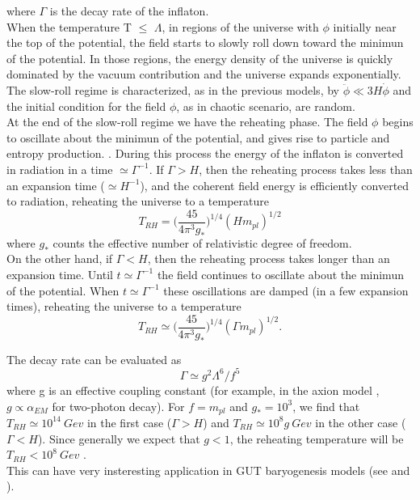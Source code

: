 \documentclass[11pt,a4paper,twoside]{book}
\begin{document}
where $\Gamma$ is the decay rate of the inflaton.\\
When the temperature T $\le$ $\Lambda$, in regions of the universe with $\phi$ initially near the top of the potential, the field starts to slowly roll down toward the minimun of the potential. In those regions, the energy density of the universe is quickly dominated by the vacuum contribution and the universe expands exponentially. The slow-roll regime is characterized,  as in the previous models, by $ \ddot{\phi} \ll 3H\dot{\phi} $ and the initial condition for the field $\phi$, as in chaotic scenario, are random. \\
At the end of the slow-roll regime we have the reheating phase. The field $\phi$ begins to oscillate about the minimun of the potential, and gives rise to particle and entropy production. .
During this process the energy of the inflaton is converted in radiation in a time $\simeq \Gamma^{-1}$. If $\Gamma > H$, then the reheating process takes less than an expansion time ($\simeq H^{-1}$), and the coherent field energy is efficiently converted to radiation, reheating the universe to a temperature \cite{Chap2:NaturalInflation_Turner_Steinhardt}
\begin{equation}
\label{Chap2:ReheatingTemperatureSmallFieldModel}
T_{RH}=\Big (\frac{45}{4\pi^{3}g_{*}}\Big )^{1/4} (Hm_{pl})^{1/2}
\end{equation}
where $ g_{*} $ counts the effective number of relativistic degree of freedom.\\
On the other hand, if $ \Gamma < H $, then the reheating process takes longer than an expansion time. Until $ t \simeq \Gamma^{-1} $ the field continues to oscillate about the minimun of the potential. When $ t \simeq \Gamma^{-1} $ these oscillations are damped (in a few expansion times), reheating the universe to a temperature
\begin{equation}
	T_{RH} \simeq \Big (\frac{45}{4\pi^{3}g_{*}}\Big)^{1/4}(\Gamma m_{pl})^{1/2}.
\end{equation}

The decay rate can be evaluated as 
\begin{equation}
	\label{Chap2:DecayRate}
	\Gamma \simeq g^{2}\Lambda^{6}/f^{5}
\end{equation}
where g is an effective coupling constant (for example, in the axion model \cite{Chap2:AxionModel}, $ g \propto \alpha_{EM} $ for two-photon decay). For $ f=m_{pl} $ and $ g_{*}=10^{3} $, we find that $ T_{RH} \simeq 10^{14}\ Gev $ in the first case ($ \Gamma > H $) and $ T_{RH} \simeq 10^{8} g\ Gev$ in the other case ($\Gamma < H$). Since generally we expect that $ g < 1 $, the reheating temperature will be $ T_{RH} < 10^{8}\ Gev $ \cite{Chap2:NaturalInflation}.\\
This can have very insteresting application in GUT baryogenesis models (see \cite{Chap2:NaturalInflation} and \cite{Chap2:NaturalInflation_Turner_Steinhardt}).
\end{document}
